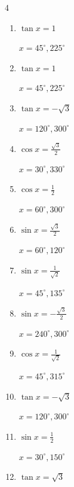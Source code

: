 \begin{multicols}{4}
\begin{enumerate}
  \item $\displaystyle \tan{x}  = 1$

        $\displaystyle x = 45^{\circ} , 225^{\circ}$

  \item $\displaystyle \tan{x}  = 1$

        $\displaystyle x = 45^{\circ} , 225^{\circ}$

  \item $\displaystyle \tan{x}  = -\sqrt{3}$

        $\displaystyle x = 120^{\circ} , 300^{\circ}$

  \item $\displaystyle \cos{x}  = \frac{\sqrt{3}}{2}$

        $\displaystyle x = 30^{\circ} , 330^{\circ}$

  \item $\displaystyle \cos{x}  = \frac{1}{2}$

        $\displaystyle x = 60^{\circ} , 300^{\circ}$

  \item $\displaystyle \sin{x}  = \frac{\sqrt{3}}{2}$

        $\displaystyle x = 60^{\circ} , 120^{\circ}$

  \item $\displaystyle \sin{x}  = \frac{1}{\sqrt{2}}$

        $\displaystyle x = 45^{\circ} , 135^{\circ}$

  \item $\displaystyle \sin{x}  = -\frac{\sqrt{3}}{2}$

        $\displaystyle x = 240^{\circ} , 300^{\circ}$

  \item $\displaystyle \cos{x}  = \frac{1}{\sqrt{2}}$

        $\displaystyle x = 45^{\circ} , 315^{\circ}$

  \item $\displaystyle \tan{x}  = -\sqrt{3}$

        $\displaystyle x = 120^{\circ} , 300^{\circ}$

\columnbreak %

  \item $\displaystyle \sin{x}  = \frac{1}{2}$

        $\displaystyle x = 30^{\circ} , 150^{\circ}$

  \item $\displaystyle \tan{x}  = \sqrt{3}$


\end{enumerate}
\end{multicols}
